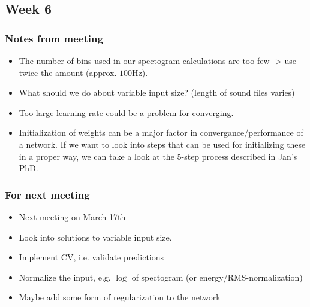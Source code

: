 
\subsection{Week 6}

\subsubsection{Notes from meeting}

\begin{itemize}
\item The number of bins used in our spectogram calculations are too few -> use twice the amount (approx. $100$Hz).
\item What should we do about variable input size? (length of sound files varies)
\item Too large learning rate could be a problem for converging.
\item Initialization of weights can be a major factor in convergance/performance of a network. If we want to look into steps that can be used for initializing these in a proper way, we can take a look at the 5-step process described in Jan's PhD.
\end{itemize}

\subsubsection{For next meeting}

\begin{itemize}
\item Next meeting on March 17th
\item Look into solutions to variable input size.
\item Implement CV, i.e. validate predictions
\item Normalize the input, e.g. $\log$ of spectogram (or energy/RMS-normalization)
\item Maybe add some form of regularization to the network
\end{itemize}
